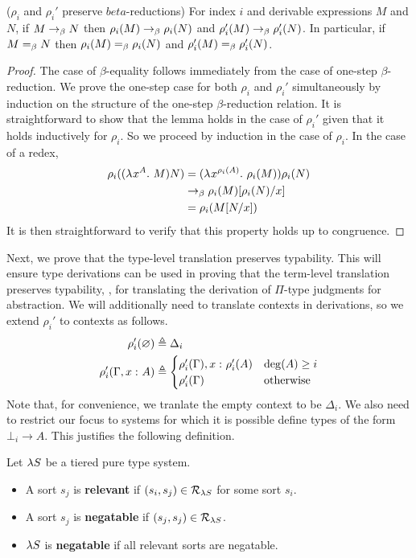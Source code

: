 \documentclass{article}
\begin{document}
\begin{lemma}
\label{lem:rho-beta}
($\rho_i$ and $\rho_i'$ preserve $beta$-reductions)
For index $i$ and derivable expressions $M$ and $N$, if $M \rightarrow_\beta N$ then $\rho_i(M) \rightarrow_\beta \rho_i(N)$ and $\rho_i'(M) \rightarrow_\beta \rho_i'(N)$.
In particular, if $M =_\beta N$ then $\rho_i(M) =_\beta \rho_i(N)$ and $\rho_i'(M) =_\beta \rho_i'(N)$.
\end{lemma}

\begin{proof}
The case of $\beta$-equality follows immediately from the case of one-step $\beta$-reduction.
We prove the one-step case for both $\rho_i$ and $\rho_i'$ simultaneously by induction on the structure of the one-step $\beta$-reduction relation.
It is straightforward to show that the lemma holds in the case of $\rho_i'$ given that it holds inductively for $\rho_i$.
So we proceed by induction in the case of $\rho_i$.
In the case of a redex,
\begin{align*}
\rho_i((\lambda^{} x^{A}. \ M)N) &=
(\lambda^{} x^{\rho_i(A)}. \ \rho_i(M)) \rho_i(N) \\ &\rightarrow_\beta
\rho_i(M)[\rho_i(N)/x] \\ &=
\rho_i(M[N/x])
\end{align*}
It is then straightforward to verify that this property holds up to congruence.
\end{proof}

Next, we prove that the type-level translation preserves typability.
This will ensure type derivations can be used in proving that the term-level translation preserves typability, \eg, for translating the derivation of $\Pi$-type judgments for abstraction. We will additionally need to translate contexts in derivations, so we extend $\rho_i'$ to contexts as follows.
\begin{align*}
\rho_i'(\varnothing) &\triangleq \Delta_i \\
\rho_i'(\Gamma, {{x} :^{} {A}}) &\triangleq
\begin{cases}
    \rho_i'(\Gamma), {{x} :^{} {\rho_i'(A)}} & \deg(A) \geq i \\
    \rho_i'(\Gamma) & \textnormal{otherwise}
\end{cases}
\end{align*}
Note that, for convenience, we tranlate the empty context to be $\Delta_i$.
We also need to restrict our focus to systems for which it is possible define types of the form $\bot_i \to A$.
This justifies the following definition.
\begin{definition}
Let $\lambda S$ be a tiered pure type system.
\begin{itemize}
    \item A sort $s_j$ is \textbf{relevant} if $(s_i, s_j) \in \mathcal R_{\lambda S}$ for some sort $s_i$.
    \item A sort $s_j$ is \textbf{negatable} if $(s_j, s_j) \in \mathcal R_{\lambda S}$.
    \item $\lambda S$ is \textbf{negatable} if all relevant sorts are negatable.
\end{itemize}
\end{definition}
\end{document}
